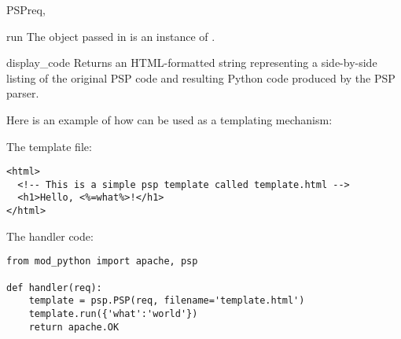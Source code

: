 \begin{classdesc}{PSP}{req, }
\begin{methoddesc}[PSP]{run}{}
    The object passed in  is an instance of
    .

  \end{methoddesc}

  \begin{methoddesc}[PSP]{display_code}{}
    Returns an HTML-formatted string representing a side-by-side
    listing of the original PSP code and resulting Python code
    produced by the PSP parser. 
  \end{methoddesc}

  Here is an example of how  can be used as a templating
  mechanism:
  
  The template file:
  \begin{verbatim}
<html>
  <!-- This is a simple psp template called template.html -->
  <h1>Hello, <%=what%>!</h1>
</html>
  \end{verbatim}
  The handler code:
  \begin{verbatim}
from mod_python import apache, psp

def handler(req):
    template = psp.PSP(req, filename='template.html')
    template.run({'what':'world'})
    return apache.OK
  \end{verbatim}

\end{classdesc}


